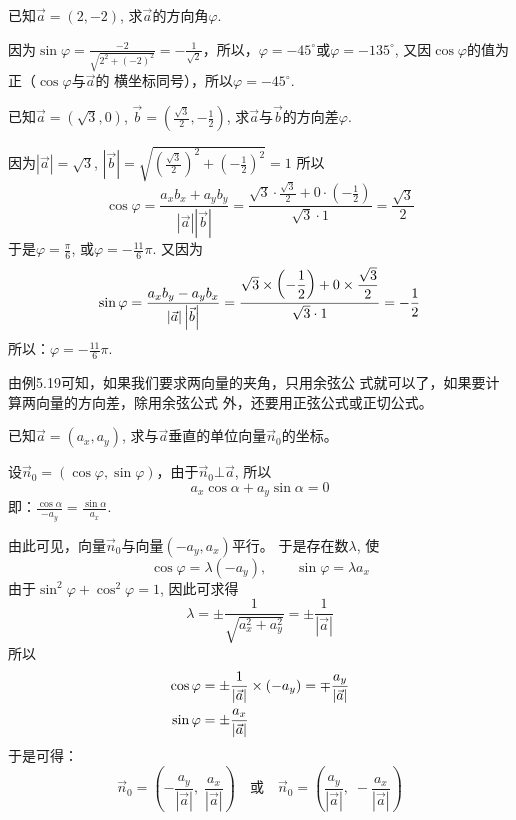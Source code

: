 \begin{example}
    已知$\vec{a}=(2,-2)$, 求$\vec{a}$的方向角$\varphi$.
\end{example}

\begin{solution}
    因为$\sin\varphi=\frac{-2}{\sqrt{2^2+(-2)^2}}=-\frac{1}{\sqrt{2}}$，所以，$\varphi=-45^{\circ}$或$\varphi=-135^{\circ}$, 又因$\cos\varphi$的值为正（$\cos\varphi$与$\vec{a}$的
横坐标同号），所以$\varphi=-45^{\circ}$.
\end{solution}


\begin{example}
    已知$\vec{a}=(\sqrt{3},0)$, $\vec{b}=\left(\frac{\sqrt{3}}{2},-\frac{1}{2}\right)$, 求$\vec{a}$与$\vec{b}$的方向差$\varphi$.
\end{example}

\begin{solution}
因为$|\vec{a}|=\sqrt{3}$, $|\vec{b}|=\sqrt{\left(\frac{\sqrt{3}}{2}\right)^2+\left(-\frac{1}{2}\right)^2}=1$
所以
\[\cos\varphi=\frac{a_xb_x+a_yb_y}{|\vec{a}|\left|\vec{b}\right|}=\frac{\sqrt{3}\cdot \frac{\sqrt{3}}{2}+0\cdot \left(-\frac{1}{2}\right)}{\sqrt{3}\cdot 1}=\frac{\sqrt{3}}{2}\]
于是$\varphi=\frac{\pi}{6}$, 或$\varphi=-\frac{11}{6}\pi$. 又因为
\[\sin\varphi=\dfrac{a_xb_y-a_yb_x}{|\vec{a}|\left|\vec{b}\right|}=\dfrac{\sqrt{3}\times \left(-\dfrac{1}{2}\right)+0\times \dfrac{\sqrt{3}}{2}}{\sqrt{3}\cdot 1}=-\dfrac{1}{2}\]
所以：$\varphi=-\frac{11}{6}\pi$.
\end{solution}

由例5.19可知，如果我们要求两向量的夹角，只用余弦公
式就可以了，如果要计算两向量的方向差，除用余弦公式
外，还要用正弦公式或正切公式。


\begin{example}
    已知$\vec{a}=(a_x,a_y)$, 求与$\vec{a}$垂直的单位向量$\vec{n}_0$的坐标。
\end{example}

\begin{solution}
    设$\vec{n}_0=(\cos\varphi,\sin\varphi)$，由于$\vec{n}_0\bot \vec{a}$, 所以
\[a_x\cos\alpha+a_y\sin\alpha= 0\]
即：$\frac{\cos\alpha}{-a_y}=\frac{\sin\alpha}{a_x}$.

由此可见，向量$\vec{n}_0$与向量$(-a_y,a_x)$平行。
于是存在数$\lambda$, 使
\[\cos\varphi=\lambda(-a_y),\qquad \sin\varphi=\lambda a_x\]
由于$\sin^2\varphi +\cos^2\varphi =1$, 因此可求得
\[\lambda=\pm\frac{1}{\sqrt{a^2_x+a^2_y}}=\pm\frac{1}{|\vec{a}|}\]
所以
\[\begin{split}
    \cos\varphi&=\pm\dfrac{1}{|\vec{a}|}\times (-a_y)=\mp\dfrac{a_y}{|\vec{a}|}\\
    \sin\varphi&=\pm\dfrac{a_x}{|\vec{a}|}
\end{split}\]
于是可得：
\[\vec{n}_0=\left(-\frac{a_y}{|\vec{a}|},\; \frac{a_x}{|\vec{a}|}\right)\quad \text{或}\quad \vec{n}_0=\left(\frac{a_y}{|\vec{a}|},\; -\frac{a_x}{|\vec{a}|}\right)\]
\end{solution}

